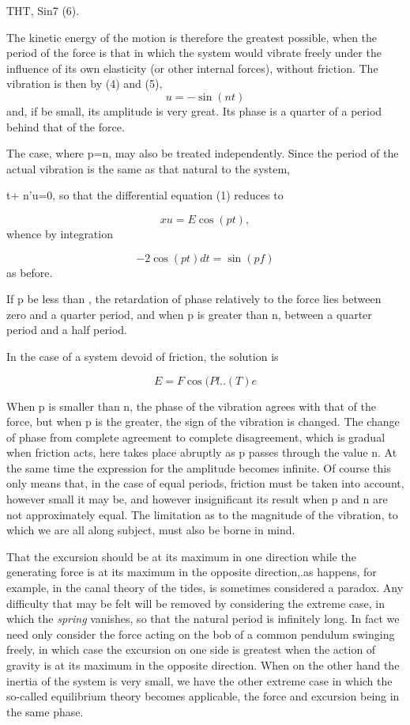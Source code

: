 THT, Sin7 (6).

The kinetic energy of the motion is therefore the greatest possible, when the
period of the force is that in which the system would vibrate freely under the
influence of its own elasticity (or other internal forces), without friction.
The vibration is then by (4) and (5),
\[u= - \sin(n t)\]
and, if be small, its
amplitude is very great. Its phase is a quarter of a period behind that of the
force.

The case, where p=n, may also be treated independently. Since the period of the
actual vibration is the same as that natural to the system,

t+ n'u=0, so that the differential equation (1) reduces to

\[xu = E \cos(pt),\]
whence by integration

\[-2 \cos(pt) dt = \sin(pf)\]
as before.

If p be less than , the retardation of phase relatively to the force lies
between zero and a quarter period, and when p is greater than n, between a
quarter period and a half period.

In the case of a system devoid of friction, the solution is

\[E = F \cos(Pl ..(T)e\]

When p is smaller than n, the phase of the vibration agrees with that of the
force, but when p is the greater, the sign of the vibration is changed. The
change of phase from complete agreement to complete disagreement, which is
gradual when friction acts, here takes place abruptly as p passes through the
value n. At the same time the expression for the amplitude becomes infinite. Of
course this only means that, in the case of equal periods, friction must be
taken into account, however small it may be, and however insignificant its
result when p and n are not approximately equal. The limitation as to the
magnitude of the vibration, to which we are all along subject, must also be
borne in mind.

That the excursion should be at its maximum in one direction while the
generating force is at its maximum in the opposite direction,.as happens, for
example, in the canal theory of the tides, is sometimes considered a paradox.
Any difficulty that may be felt will be removed by considering the extreme
case, in which the \emph{spring} vanishes, so that the natural period is
infinitely long. In fact we need only consider the force acting on the bob of a
common pendulum swinging freely, in which case the excursion on one side is
greatest when the action of gravity is at its maximum in the opposite
direction. When on the other hand the inertia of the system is very small, we
have the other extreme case in which the so-called equilibrium theory becomes
applicable, the force and excursion being in the same phase.

